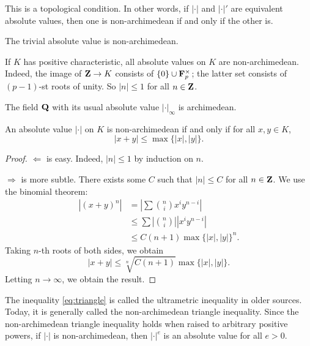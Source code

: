 This is a topological condition. In other words, if $|\cdot|$ and $|\cdot|'$ 
are equivalent absolute values, then one is non-archimedean if and only if the 
other is. 

\begin{example}
The trivial absolute value is non-archimedean. 
\end{example}

\begin{example}
If $K$ has positive characteristic, all absolute values on $K$ are 
non-archimedean. Indeed, the image of $\mathbf{Z}\to K$ consists of 
$\{0\}\cup \mathbf{F}_p^\times$; the latter set consists of $(p-1)$-st roots of 
unity. So $|n|\leqslant 1$ for all $n\in \mathbf{Z}$. 
\end{example}

\begin{example}
The field $\mathbf{Q}$ with its usual absolute value $|\cdot|_\infty$ is archimedean. 
\end{example}

\begin{theorem}\label{thm:non-arch-characterization}
An absolute value $|\cdot|$ on $K$ is non-archimedean if and only if for all 
$x,y\in K$, 
\begin{equation}\label{eq:triangle}
  |x+y|\leqslant \max\{|x|,|y|\} .
\end{equation}
\end{theorem}
\begin{proof}
$\Leftarrow$ is easy. Indeed, $|n|\leqslant 1$ by induction on $n$. 

$\Rightarrow$ is more subtle. There exists some $C$ such that 
$|n|\leqslant C$ for all $n\in \mathbf{Z}$. We use the binomial theorem: 
\begin{align*}
  |(x+y)^n| 
    &= \left|\sum \binom n i x^i y^{n-i} \right| \\
    &\leqslant \sum \left|\binom n i \right| |x^i y^{n-i}| \\
    &\leqslant C(n+1)\max\{|x|,|y|\}^n .
\end{align*}
Taking $n$-th roots of both sides, we obtain 
\[
  |x+y|\leqslant \sqrt[n]{C(n+1)} \max\{|x|,|y|\} .
\]
Letting $n\to \infty$, we obtain the result. 
\end{proof}

The inequality \eqref{eq:triangle} is called the ultrametric inequality in 
older sources. Today, it is generally called the non-archimedean triangle 
inequality. Since the non-archimedean triangle inequality holds when raised to 
arbitrary positive powers, if $|\cdot|$ is non-archimedean, then 
$|\cdot|^e$ is an absolute value for all $e>0$. 

